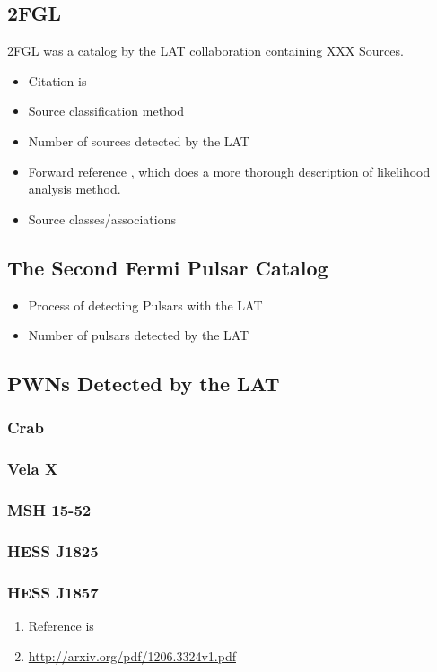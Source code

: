 \subsection{\acf{2FGL}}

\ac{2FGL} was a catalog by the LAT collaboration containing XXX Sources.

\begin{itemize}
  \item Citation is \cite{nolan_2012_telescope-second}
  \item Source classification method
  \item Number of sources detected by the \ac{LAT}
  \item Forward reference ,
    which does a more thorough description of likelihood analysis method.
  \item Source classes/associations
\end{itemize}

\subsection{The Second Fermi Pulsar Catalog}

\begin{itemize}
  \item Process of detecting Pulsars with the \ac{LAT}
  \item Number of pulsars detected by the \ac{LAT}
\end{itemize}

\subsection{\acsp{PWN} Detected by the \ac{LAT}}

\subsubsection{Crab}

\subsubsection{Vela X}

\subsubsection{MSH 15-52}

\subsubsection{HESS J1825}

\subsubsection{HESS J1857}


\begin{enumerate}
  \item Reference is \cite{rousseau_2012_fermi-lat-constraints}
  \item \url{http://arxiv.org/pdf/1206.3324v1.pdf}
\end{enumerate}
